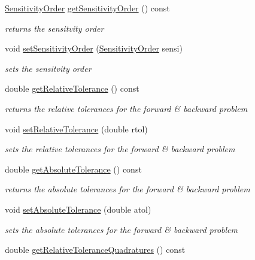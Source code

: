 \begin{DoxyCompactItemize}
\mbox{\hyperlink{namespaceamici_aaa03ec2f8c4d5323b98d71134a462fda}{Sensitivity\+Order}} \mbox{\hyperlink{classamici_1_1_solver_affde3089fec2a1cca40d6cc0c4c2cf1d}{get\+Sensitivity\+Order}} () const
\begin{DoxyCompactList}\small\item\em returns the sensitvity order \end{DoxyCompactList}\item 
void \mbox{\hyperlink{classamici_1_1_solver_a26129f061fdf7869be2d3e4aa22532b6}{set\+Sensitivity\+Order}} (\mbox{\hyperlink{namespaceamici_aaa03ec2f8c4d5323b98d71134a462fda}{Sensitivity\+Order}} sensi)
\begin{DoxyCompactList}\small\item\em sets the sensitvity order \end{DoxyCompactList}\item 
double \mbox{\hyperlink{classamici_1_1_solver_a54fe1b062315ed19b2dbf88206415e06}{get\+Relative\+Tolerance}} () const
\begin{DoxyCompactList}\small\item\em returns the relative tolerances for the forward \& backward problem \end{DoxyCompactList}\item 
void \mbox{\hyperlink{classamici_1_1_solver_afb5f0c48f24e4bc3efad8ef599adde56}{set\+Relative\+Tolerance}} (double rtol)
\begin{DoxyCompactList}\small\item\em sets the relative tolerances for the forward \& backward problem \end{DoxyCompactList}\item 
double \mbox{\hyperlink{classamici_1_1_solver_a676df944b6737474dd4ef74fe9212f3e}{get\+Absolute\+Tolerance}} () const
\begin{DoxyCompactList}\small\item\em returns the absolute tolerances for the forward \& backward problem \end{DoxyCompactList}\item 
void \mbox{\hyperlink{classamici_1_1_solver_afe0fd2fad6ce110ad8421f5979945f90}{set\+Absolute\+Tolerance}} (double atol)
\begin{DoxyCompactList}\small\item\em sets the absolute tolerances for the forward \& backward problem \end{DoxyCompactList}\item 
double \mbox{\hyperlink{classamici_1_1_solver_a40124a6593fea7f5ddbf39385b021a9e}{get\+Relative\+Tolerance\+Quadratures}} () const

\end{DoxyCompactItemize}
